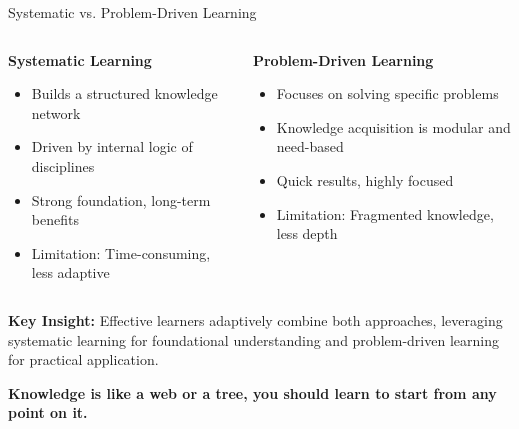 \begin{frame}[fragile]{ Systematic vs. Problem-Driven Learning}
	\scriptsize
	\begin{columns}
		\begin{column}{0.45\textwidth}
			\textbf{Systematic Learning}
			\begin{itemize}
				\item Builds a structured knowledge network
				\item Driven by internal logic of disciplines
				\item Strong foundation, long-term benefits
				\item Limitation: Time-consuming, less adaptive
			\end{itemize}
		\end{column}
		\begin{column}{0.55\textwidth}
			\textbf{Problem-Driven Learning}
			\begin{itemize}
				\item Focuses on solving specific problems
				\item Knowledge acquisition is modular and need-based
				\item Quick results, highly focused
				\item Limitation: Fragmented knowledge, less depth
			\end{itemize}
		\end{column}
	\end{columns}
	\vspace{0.5cm}
	\textbf{Key Insight:} Effective learners adaptively combine both approaches, leveraging systematic learning for foundational understanding and problem-driven learning for practical application.


	\textbf{Knowledge is like a web or a tree, you should learn to start from any point on it.}

\end{frame}

